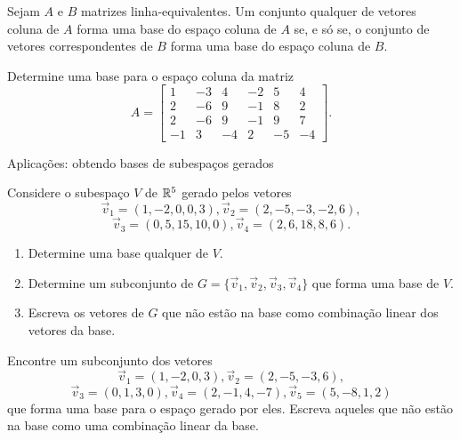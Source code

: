 \begin{frame}[label=lild]{}

\begin{teo}
Sejam {\color{blue}$A$} e {\color{red}$B$} matrizes linha-equivalentes. 
Um conjunto qualquer de vetores coluna de {\color{blue}$A$} forma uma base do espaço coluna de {\color{blue}$A$} se, e só se, o conjunto de vetores correspondentes de {\color{red}$B$} forma uma base do espaço coluna de {\color{red}$B$}.
\end{teo}

\begin{exe}
Determine uma base para o espaço coluna da matriz
\[
A=\begin{bmatrix}
1 & -3 & 4 & -2 & 5 & 4\\
2 & -6 & 9 & -1 & 8 & 2\\
2 & -6 & 9 & -1 & 9 & 7\\
-1 & 3& -4 & 2 & -5 & -4
\end{bmatrix}.
\]
\end{exe}

\end{frame}

\begin{frame}[label=lild]{Aplicações: obtendo bases de subespaços gerados}
\begin{exe} Considere o subespaço $V$ de $\mathbb{R}^5$ gerado pelos vetores
\[\vec{v}_1=(1,-2,0,0,3), \vec{v}_2=(2,-5,-3,-2,6),
\]
\[\vec{v}_3=(0,5,15,10,0), \vec{v}_4=(2,6,18,8,6).
\]
\begin{enumerate}
\item Determine uma base qualquer de $V$.

\item Determine um subconjunto de $G=\{\vec{v}_1,\vec{v}_2,\vec{v}_3,\vec{v}_4\}$ que forma uma base de $V$.
\item Escreva os vetores de $G$ que não estão na base como combinação linear dos vetores da base.
\end{enumerate}

\end{exe}

\end{frame}


\begin{frame}[label=lild]
\begin{casa} Encontre um subconjunto dos vetores 
\[\vec{v}_1=(1,-2,0,3), \vec{v}_2=(2,-5,-3,6),
\]
\[\vec{v}_3=(0,1,3,0), \vec{v}_4=(2,-1,4,-7), \vec{v}_5=(5,-8,1,2)
\]
que forma uma base para o espaço gerado por eles. Escreva aqueles que não estão na base como uma combinação linear da base. 

\end{casa}
\end{frame}






